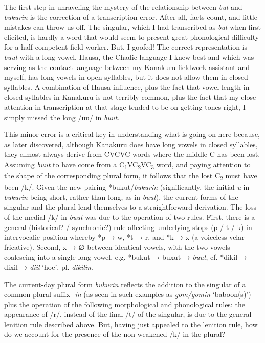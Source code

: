 \documentclass[output=paper,colorlinks,citecolor=brown]{langscibook}
\begin{document}
The first step in unraveling the mystery of the relationship between \textit{but} and \textit{bukurin} is the correction of a transcription error. After all, facts count, and little mistakes can throw us off. The singular, which I had transcribed as \textit{but} when first elicited, is hardly a word that would seem to present great phonological difficulty for a half-competent field worker. But, I goofed! The correct representation is \textit{buut} with a long vowel. Hausa, the Chadic language I knew best and which was serving as the contact language between my Kanakuru fieldwork assistant and myself, has long vowels in open syllables, but it does not allow them  in closed syllables. A combination of Hausa influence, plus the fact that vowel length in closed syllables in Kanakuru is not terribly common, plus the fact that my close attention in transcription at that stage tended to be on getting tones right, I simply missed the long /uu/ in \textit{buut}. 

This minor error is a critical key in understanding what is going on here because, as later discovered, although Kanakuru does have long vowels in closed syllables, they almost always derive from CVCVC words where the middle C has been lost. Assuming \textit{buut} to have come from a C\textsubscript{1}VC\textsubscript{2}VC\textsubscript{3} word, and paying attention to the  shape of the corresponding plural form, it follows that the lost C\textsubscript{2} must have been /k/. Given the new pairing *bukut/\textit{bukurin} (significantly, the initial \textit{u} in \textit{bukurin} being short, rather than long, as in \textit{buut}), the current forms of the singular and the plural lend themselves to a straightforward derivation. The loss of the medial /k/ in \textit{buut} was due to the operation of two rules. First, there is a general (historical? / synchronic?)  rule affecting underlying stops (p / t / k) in intervocalic position whereby *p → w, *t → r, and *k → x (a voiceless velar fricative). Second, x → ∅ between identical vowels, with the two vowels coalescing into a single long vowel, e.g. *bukut → buxut → \textit{buut}, cf. *dikil → dixil → \textit{diil} `hoe’, pl. \textit{dikilin}.  

The current-day plural form \textit{bukurin} reflects the addition to the singular of a common plural suffix \textit{-in} (as seen in such examples as \textit{gom/gomin} `baboon(s)’) plus the operation of the following morphological and phonological rules: the appearance of /r/, instead of the final /t/ of the singular, is due to the general lenition rule described above. But, having just appealed to the lenition rule, how do we account for the presence of the non-weakened /k/ in the plural? 
\end{document}
